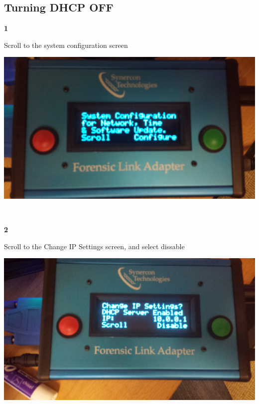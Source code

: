 \documentclass[11pt, oneside]{book}
\begin{document}
\subsection{Turning DHCP OFF}
\noindent\begin{minipage}{0.45\textwidth}%
\begin{center}
\textbf{1}\\[\baselineskip]
\end{center}
Scroll to the system configuration screen
\end{minipage}%
\hfill%
\begin{minipage}{0.45\textwidth}
\includegraphics[width=\linewidth]{../media/fla_screens/sys_conf}
\end{minipage}
\\[\baselineskip]
\noindent\begin{minipage}{0.45\textwidth}%
\begin{center}
\textbf{2}\\[\baselineskip]
\end{center}
Scroll to the Change IP Settings screen, and select dissable
\end{minipage}%
\hfill%
\begin{minipage}{0.45\textwidth}
\includegraphics[width=\linewidth]{../media/fla_screens/sys_conf_dhcp_enable}
\end{minipage}
\end{document}
